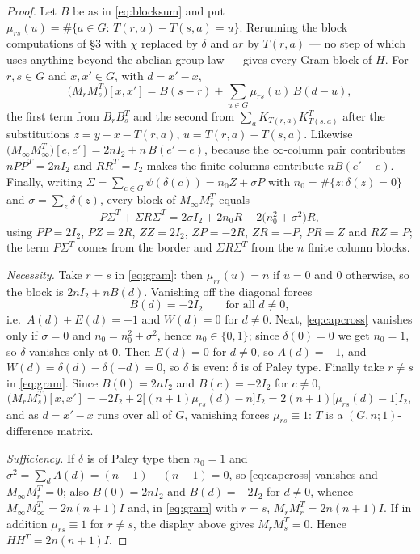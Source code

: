 \documentclass[11pt]{article}
\newcommand{\I}{I}
\begin{document}
\begin{proof}
Let \(B\) be as in \eqref{eq:blocksum} and put
\(\mu_{rs}(u)=\#\{a\in G:\,T(r,a)-T(s,a)=u\}\).  Rerunning the block
computations of \S3 with \(\chi\) replaced by \(\delta\) and \(ar\) by
\(T(r,a)\) --- no step of which uses anything beyond the abelian group law
--- gives every Gram block of \(H\).  For \(r,s\in G\) and \(x,x'\in G\), with
\(d=x'-x\),
\[
        \bigl(M_rM_s^{T}\bigr)[x,x']
        =B(s-r)+\sum_{u\in G}\mu_{rs}(u)\,B(d-u),
        \tag{5.2}\label{eq:gram}
\]
the first term from \(B_rB_s^{T}\) and the second from
\(\sum_aK_{T(r,a)}K_{T(s,a)}^{T}\) after the substitutions
\(z=y-x-T(r,a)\), \(u=T(r,a)-T(s,a)\).  Likewise
\(\bigl(M_\infty M_\infty^{T}\bigr)[e,e']=2n\I_2+n\,B(e'-e)\), because the
\(\infty\)-column pair contributes \(nPP^{T}=2n\I_2\) and
\(RR^{T}=\I_2\) makes the finite columns contribute \(nB(e'-e)\).  Finally,
writing \(\Sigma=\sum_{c\in G}\psi(\delta(c))=n_0Z+\sigma P\) with
\(n_0=\#\{z:\delta(z)=0\}\) and \(\sigma=\sum_z\delta(z)\), every block of
\(M_\infty M_r^{T}\) equals
\[
        P\Sigma^{T}+\Sigma R\Sigma^{T}
        =2\sigma\I_2+2n_0R-2\bigl(n_0^{2}+\sigma^{2}\bigr)R,
        \tag{5.3}\label{eq:capcross}
\]
using \(PP=2\I_2\), \(PZ=2R\), \(ZZ=2\I_2\), \(ZP=-2R\), \(ZR=-P\),
\(PR=Z\) and \(RZ=P\); the term \(P\Sigma^{T}\) comes from the border and
\(\Sigma R\Sigma^{T}\) from the \(n\) finite column blocks.

\emph{Necessity.}  Take \(r=s\) in \eqref{eq:gram}: then
\(\mu_{rr}(u)=n\) if \(u=0\) and \(0\) otherwise, so the block is
\(2n\I_2+nB(d)\).  Vanishing off the diagonal forces
\[
        B(d)=-2\I_2\qquad\text{for all }d\neq0,
\]
i.e.\ \(A(d)+E(d)=-1\) and \(W(d)=0\) for \(d\neq0\).  Next,
\eqref{eq:capcross} vanishes only if \(\sigma=0\) and
\(n_0=n_0^{2}+\sigma^{2}\), hence \(n_0\in\{0,1\}\); since \(\delta(0)=0\) we
get \(n_0=1\), so \(\delta\) vanishes only at \(0\).  Then \(E(d)=0\) for
\(d\neq0\), so \(A(d)=-1\), and \(W(d)=\delta(d)-\delta(-d)=0\), so
\(\delta\) is even: \(\delta\) is of Paley type.  Finally take \(r\neq s\) in
\eqref{eq:gram}.  Since \(B(0)=2n\I_2\) and \(B(c)=-2\I_2\) for \(c\neq0\),
\[
        \bigl(M_rM_s^{T}\bigr)[x,x']
        =-2\I_2+2\bigl[(n+1)\mu_{rs}(d)-n\bigr]\I_2
        =2(n+1)\bigl[\mu_{rs}(d)-1\bigr]\I_2 ,
\]
and as \(d=x'-x\) runs over all of \(G\), vanishing forces
\(\mu_{rs}\equiv1\): \(T\) is a \((G,n;1)\)-difference matrix.

\emph{Sufficiency.}  If \(\delta\) is of Paley type then \(n_0=1\) and
\(\sigma^{2}=\sum_{d}A(d)=(n-1)-(n-1)=0\), so \eqref{eq:capcross} vanishes and
\(M_\infty M_r^{T}=0\); also \(B(0)=2n\I_2\) and \(B(d)=-2\I_2\) for
\(d\neq0\), whence \(M_\infty M_\infty^{T}=2n(n+1)\I\) and, in
\eqref{eq:gram} with \(r=s\), \(M_rM_r^{T}=2n(n+1)\I\).  If in addition
\(\mu_{rs}\equiv1\) for \(r\neq s\), the display above gives
\(M_rM_s^{T}=0\).  Hence \(HH^{T}=2n(n+1)\I\).
\end{proof}
\end{document}
